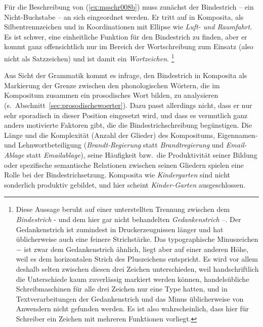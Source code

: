 Für die Beschreibung von (\ref{ex:msschr008b}) muss zunächst der Bindestrich -- ein Nicht-Buchstabe -- an sich eingeordnet werden.
Er tritt auf in Komposita, als Silbentrennzeichen und in Koordinationen mit Ellipse wie \textit{Luft- und Raumfahrt}.
Es ist schwer, eine einheitliche Funktion für den Bindestrich zu finden, aber er kommt ganz offensichtlich nur im Bereich der Wortschreibung zum Einsatz (also nicht als Satzzeichen) und ist damit ein \textit{Wortzeichen}.%
\footnote{Diese Aussage beruht auf einer unterstellten Trennung zwischen dem \textit{Bindestrich} - und dem hier gar nicht behandelten \textit{Gedankenstrich} --.
Der Gedankenstrich ist zumindest in Druckerzeugnissen länger und hat üblicherweise auch eine feinere Strichstärke.
Das typographische Minuszeichen $-$ ist zwar dem Gedankenstrich ähnlich, liegt aber auf einer anderen Höhe, weil es dem horizontalen Strich des Pluszeichens entspricht. 
Es wird vor allem deshalb selten zwischen diesen drei Zeichen unterschieden, weil handschriftlich die Unterschiede kaum zuverlässig markiert werden können, handelsübliche Schreibmaschinen für alle drei Zeichen nur eine Type hatten, und in Textverarbeitungen der Gedankenstrich und das Minus üblicherweise von Anwendern nicht gefunden werden.
Es ist also wahrscheinlich, dass hier für Schreiber ein Zeichen mit mehreren Funktionen vorliegt.}


Aus Sicht der Grammatik kommt es infrage, den Bindestrich in Komposita als Markierung der Grenze zwischen den phonologischen Wörtern, die im Kompositum zusammen ein prosodisches Wort bilden, zu analysieren (s.\ Abschnitt~\ref{sec:prosodischewoerter}).
Dazu passt allerdings nicht, dass er nur sehr sporadisch in dieser Position eingesetzt wird, und dass es vermutlich ganz anders motivierte Faktoren gibt, die die Bindestrichschreibung begünstigen.
Die Länge und die Komplexität (Anzahl der Glieder) des Kompositums, Eigennamen- und Lehnwortbeteiligung (\textit{Brandt-Regierung} statt \textit{Brandtregierung} und \textit{Email-Ablage} statt \textit{Emailablage}), seine Häufigkeit bzw.\ die Produktivität seiner Bildung oder spezifische semantische Relationen zwischen seinen Gliedern spielen eine Rolle bei der Bindestrichsetzung.
Komposita wie \textit{Kindergarten} sind \zB nicht sonderlich produktiv gebildet, und hier scheint \textit{Kinder-Garten} ausgeschlossen.

